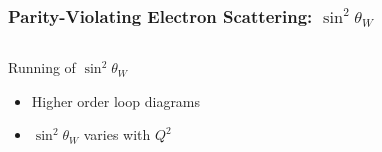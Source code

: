 \begin{frame}[label=sin2tw]
 \frametitle{Parity-Violating Electron Scattering: $\sin^2 \theta_W$}
 \begin{columns}
   \begin{block}{Running of $\sin^2 \theta_W$}
    \begin{itemize}
     \item Higher order loop diagrams
     \item $\sin^2 \theta_W$ varies with $Q^2$
    \end{itemize}
   \end{block}
 \end{columns}
 \begin{center}
  \begin{figure}
  \end{figure}
 \end{center}
\end{frame}
